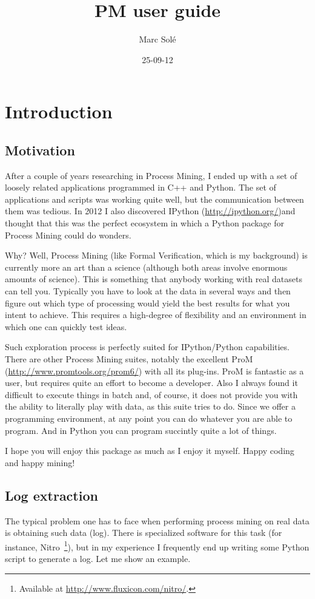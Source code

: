 \documentclass[a4paper,10pt]{book}
\title{PM user guide}
\author{Marc Solé}
\date{25-09-12}
\begin{document}
 \maketitle

\tableofcontents

\chapter{Introduction}
\section{Motivation}
After a couple of years researching in Process Mining, I ended up with a set of loosely related applications programmed in C++ and Python. The set of applications and scripts was working quite well, but the communication between them was tedious. In 2012 I also discovered IPython (\url{http://ipython.org/})and thought that this was the perfect ecosystem in which a Python package for Process Mining could do wonders.

Why? Well, Process Mining (like Formal Verification, which is my background) is currently more an art than a science (although both areas involve enormous amounts of science). This is something that anybody working with real datasets can tell you. Typically you have to look at the data in several ways and then figure out which type of processing would yield the best results for what you intent to achieve. This requires a high-degree of flexibility and an environment in which one can quickly test ideas.

Such exploration process is perfectly suited for IPython/Python capabilities. There are other Process Mining suites, notably the excellent ProM~\cite{AalstDGMMRRSVW07} (\url{http://www.promtools.org/prom6/}) with all its plug-ins. ProM is fantastic as a user, but requires quite an effort to become a developer. Also I always found it difficult to execute things in batch and, of course, it does not provide you with the ability to literally play with data, as this suite tries to do. Since we offer a programming environment, at any point you can do whatever you are able to program. And in Python you can program succintly quite a lot of things.

I hope you will enjoy this package as much as I enjoy it myself. Happy coding and happy mining!

\section{Log extraction}
The typical problem one has to face when performing process mining on real data is obtaining such data (log). There is specialized software for this task (for instance, Nitro~\footnote{Available at \url{http://www.fluxicon.com/nitro/}.}), but in my experience I frequently end up writing some Python script to generate a log. Let me show an example.
\end{document}
